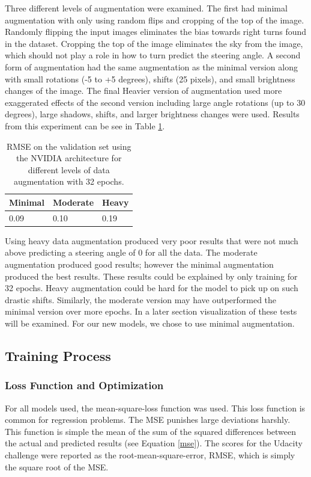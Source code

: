 \documentclass[10pt,twocolumn,letterpaper]{article}
\begin{document}
Three different levels of augmentation were examined. The first had minimal augmentation with only using random flips and cropping of the top of the image. Randomly flipping the input images eliminates the bias towards right turns found in the dataset. Cropping the top of the image eliminates the sky from the image, which should not play a role in how to turn predict the steering angle. A second form of augmentation had the same augmentation as the minimal version along with small rotations (-5 to +5 degrees), shifts (25 pixels), and small brightness changes of the image. The final Heavier version of augmentation used more exaggerated effects of the second version including large angle rotations (up to 30 degrees), large shadows, shifts, and larger brightness changes were used. Results from this experiment can be see in Table \ref{data_aug_table}.

\begin{table}[!htb]
	\centering
	\caption{RMSE on the validation set using the NVIDIA architecture for different levels of data augmentation with 32 epochs.}
	\label{data_aug_table}
	\begin{tabular}{|l|l|l|}
		\hline
		\textbf{Minimal} & \textbf{Moderate} & \textbf{Heavy} \\ \hline
		0.09             & 0.10              & 0.19           \\ \hline
	\end{tabular}
\end{table}
 
Using heavy data augmentation produced very poor results that were not much above predicting a steering angle of 0 for all the data. The moderate augmentation produced good results; however the minimal augmentation produced the best results. These results could be explained by only training for 32 epochs. Heavy augmentation could be hard for the model to pick up on such drastic shifts. Similarly, the moderate version may have outperformed the minimal version over more epochs. In a later section visualization of these tests will be examined. For our new models, we chose to use minimal augmentation.

 
 




\subsection{Training Process}

\subsubsection{Loss Function and Optimization}
For all models used, the mean-square-loss function was used. This loss function is common for regression problems. The MSE punishes large deviations harshly. This function is simple the mean of the sum of the squared differences between the actual and predicted results (see Equation \ref{mse}). The scores for the Udacity challenge were reported as the root-mean-square-error, RMSE, which is simply the square root of the MSE.
\end{document}

